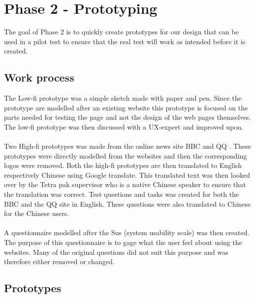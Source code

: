 
\chapter{Phase 2 - Prototyping} %

\label{Chapter5} %

The goal of Phase 2 is to quickly create prototypes for our design that can be used in a pilot test to ensure that the real test will work as intended before it is created. 

\section{Work process}
The Low-fi prototype was a simple sketch made with paper and pen. Since the prototype are modelled after an existing website this prototype is focused on the parts needed for testing the page and not the design of the web pages themselves. The low-fi prototype was then discussed with a UX-expert and improved upon.
\\\\
Two High-fi prototypes was made from the online news site BBC \cite{bbc} and QQ \cite{qq_homepage}. These prototypes were directly modelled from the websites and then the corresponding logos were removed. Both the high-fi prototypes are then translated to English respectively Chinese using Google translate. This translated text was then looked over by the Tetra pak supervisor who is a native Chinese speaker to ensure that the translation was correct. Test questions and tasks was created for both the BBC and the QQ site in English. These questions were also translated to Chinese for the Chinese users.
\\\\
A questionnaire modelled after the Sus (system usability scale) was then created. The purpose of this questionnaire is to gage what the user feel about using the websites. Many of the original questions did not suit this purpose and was therefore either removed or changed.

\section{Prototypes}

